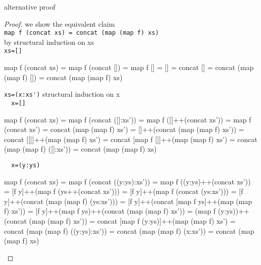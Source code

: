 \newpage
alternative proof
\begin{proof} we show the equivalent claim \\
\verb|map f (concat xs) = concat (map (map f) xs)|\\
by structural induction on xs\\
\verb|xs=[]|
\begin{code}
map f (concat xs) = map f (concat [])
                  = map f []
                  = []
                  = concat []
                  = concat (map (map f) [])
                  = concat (map (map f) xs)
\end{code}
\verb|xs=(x:xs')|
structural induction on x\\
\verb|  x=[]|
\begin{code}
map f (concat xs) = map f (concat ([]:xs'))
                  = map f ([]++(concat xs'))
                  = map f (concat xs')
                  = concat (map (map f) xs')
                  = []++(concat (map (map f) xs'))
                  = concat [[]]++(map (map f) xs')
                  = concat [map f []]++(map (map f) xs')
                  = concat (map (map f) ([]:xs'))
                  = concat (map (map f) xs)
\end{code}
\verb|  x=(y:ys)|
\begin{code}
map f (concat xs) = map f (concat ((y:ys):xs'))
                  = map f ((y:ys)++(concat xs'))
                  = [f y]++(map f (ys++(concat xs')))
                  = [f y]++(map f (concat (ys:xs')))
                  = [f y]++(concat (map (map f) (ys:xs')))
                  = [f y]++(concat [map f ys]++(map (map f) xs'))
                  = [f y]++(map f ys)++(concat (map (map f) xs'))
                  = (map f (y:ys))++(concat (map (map f) xs'))
                  = concat [map f (y:ys)]++(map (map f) xs')
                  = concat (map (map f) ((y:ys):xs'))
                  = concat (map (map f) (x:xs'))
                  = concat (map (map f) xs)
\end{code}
\end{proof}